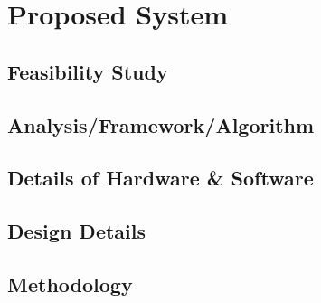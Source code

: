 \chapter{Proposed System}
\section{Feasibility Study}
\blindtext

\section{Analysis/Framework/Algorithm }
\blindtext

\section{Details of Hardware \& Software}
\blindtext

\section{Design Details}
\blindtext

\section{Methodology}
\blindtext

\newpage